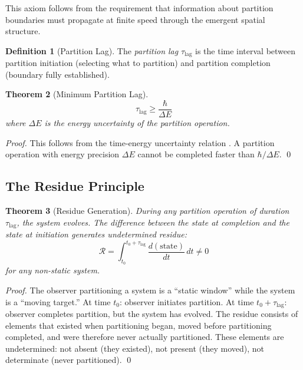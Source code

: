 \documentclass[twocolumn,10pt,a4paper]{article}
\newtheorem{theorem}{Theorem}[section]
\theoremstyle{definition}
\newtheorem{definition}[theorem]{Definition}
\theoremstyle{remark}
\newcommand{\Lag}{\tau_{\mathrm{lag}}}
\newcommand{\Residue}{\mathcal{R}}
\begin{document}
This axiom follows from the requirement that information about partition boundaries must propagate at finite speed through the emergent spatial structure.

\begin{definition}[Partition Lag]
The \emph{partition lag} $\Lag$ is the time interval between partition initiation (selecting what to partition) and partition completion (boundary fully established).
\end{definition}

\begin{theorem}[Minimum Partition Lag]
\label{thm:min-lag}
\begin{equation}
    \Lag \geq \frac{\hbar}{\Delta E}
\end{equation}
where $\Delta E$ is the energy uncertainty of the partition operation.
\end{theorem}

\begin{proof}
This follows from the time-energy uncertainty relation \citep{mandelstam1991,heisenberg1927}. A partition operation with energy precision $\Delta E$ cannot be completed faster than $\hbar/\Delta E$. \qed
\end{proof}

\subsection{The Residue Principle}

\begin{theorem}[Residue Generation]
\label{thm:residue}
During any partition operation of duration $\Lag$, the system evolves. The difference between the state at completion and the state at initiation generates \emph{undetermined residue}:
\begin{equation}
    \Residue = \int_{t_0}^{t_0 + \Lag} \frac{d(\text{state})}{dt} \, dt \neq 0
\end{equation}
for any non-static system.
\end{theorem}

\begin{proof}
The observer partitioning a system is a ``static window'' while the system is a ``moving target.'' At time $t_0$: observer initiates partition. At time $t_0 + \Lag$: observer completes partition, but the system has evolved. The residue consists of elements that existed when partitioning began, moved before partitioning completed, and were therefore never actually partitioned. These elements are undetermined: not absent (they existed), not present (they moved), not determinate (never partitioned). \qed
\end{proof}
\end{document}
